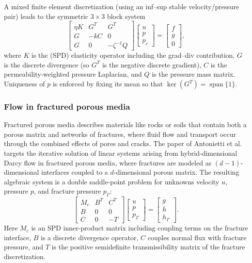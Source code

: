 \documentclass{article}
\begin{document}
A mixed finite element discretization (using an inf--sup stable velocity/pressure pair) leads to the symmetric $3\times3$ block system
\[
\begin{bmatrix}
\eta K & G^{T} & G^{T}\\
G & -kC & 0 \\
G & 0 & -\zeta^{-1}Q
\end{bmatrix}
\begin{bmatrix}
u\\[2pt] p\\[2pt] p_c
\end{bmatrix}
=
\begin{bmatrix}
f\\ g\\ 0
\end{bmatrix},
\]
where $K$ is the (SPD) elasticity operator including the grad--div contribution, $G$ is the discrete divergence (so $G^{T}$ is the negative discrete gradient), $C$ is the permeability-weighted pressure Laplacian, and $Q$ is the pressure mass matrix. Uniqueness of $p$ is enforced by fixing its mean so that $\ker(G^{T})=\operatorname{span}\{1\}$.

\subsubsection{Flow in fractured porous media}

Fractured porous media \cite{WarrenRoot1963}
describes materials like rocks or soils that contain both a porous matrix and networks of fractures, where fluid flow and transport occur through the combined effects of pores and cracks.
The paper of Antonietti et al. \cite{apfs20} targets the iterative solution of linear systems arising from hybrid‑dimensional Darcy flow in fractured porous media, where fractures are modeled as $(d-1)$-dimensional interfaces coupled to a $d$-dimensional porous matrix. The resulting algebraic system is a double saddle‑point problem for unknowns velocity $u$, pressure $p$, and fracture pressure $p_{\Gamma}$:
\[
\begin{bmatrix}
    M_c & B^T & C^T \\
    B & 0 & 0 \\
    C & 0 & -T
\end{bmatrix}\begin{bmatrix}
    u \\
    p \\
    p_{\Gamma} 
\end{bmatrix}= \begin{bmatrix}
        g \\
        h \\
        h_{\Gamma}
    \end{bmatrix}.
\]
Here $M_c$ is an SPD inner-product matrix including coupling terms on the fracture interface, $B$ is a discrete divergence operator, $C$ couples normal flux with fracture pressure, and $T$ is the positive semidefinite transmissibility matrix of the fracture discretization.
\end{document}
